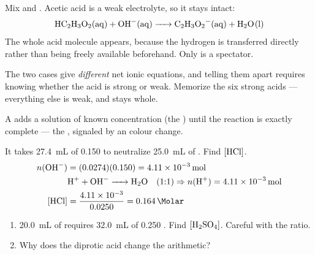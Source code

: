 \documentclass{apchem-notes}
\begin{document}
\begin{workedexample}
Mix  and . Acetic acid is a weak electrolyte,
so it stays intact:
\[ \ce{HC2H3O2(aq) + OH^-(aq) -> C2H3O2^-(aq) + H2O(l)} \]
The whole acid molecule appears, because the hydrogen is transferred
directly rather than being freely available beforehand. Only  is a
spectator.
\end{workedexample}

\begin{apctrap}
The two cases give \emph{different} net ionic equations, and telling them
apart requires knowing whether the acid is strong or weak. Memorize the six
strong acids --- everything else is weak, and stays whole.
\end{apctrap}


A  adds a solution of known concentration (the
) until the reaction is exactly complete --- the
, signaled by an
 colour change.

\begin{workedexample}
It takes \SI{27.4}{\milli\liter} of \SI{0.150}{\Molar}  to
neutralize \SI{25.0}{\milli\liter} of . Find $[\ce{HCl}]$.
\begin{align*}
  n(\ce{OH-}) &= (0.0274)(0.150) = \SI{4.11e-3}{\mole}\\
  &\ce{H+ + OH^- -> H2O} \quad (1{:}1) \Rightarrow n(\ce{H+}) = \SI{4.11e-3}{\mole}\\
  [\ce{HCl}] &= \frac{4.11\times10^{-3}}{0.0250} = \SI{0.164}{\Molar}
\end{align*}
\end{workedexample}

\begin{enumerate}[leftmargin=*,itemsep=0.4em]
  \item \SI{20.0}{\milli\liter} of  requires
        \SI{32.0}{\milli\liter} of \SI{0.250}{\Molar} . Find
        $[\ce{H2SO4}]$. Careful with the ratio. \workspace[2.6cm]
  \item Why does the diprotic acid change the arithmetic?
\end{enumerate}
\end{document}

